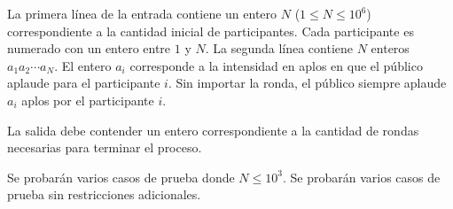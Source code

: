 \documentclass{oci}
\begin{document}
\begin{inputDescription}
La primera línea de la entrada contiene un entero $N$
($1 \leq N \leq 10^6$) correspondiente a la cantidad
inicial de participantes.
%
Cada participante es numerado con un entero entre $1$ y $N$.
%
La segunda línea contiene $N$ enteros $a_1 a_2 \cdots a_N$.
%
El entero $a_i$ corresponde a la intensidad en aplos en que el público
aplaude para el participante $i$.
%
Sin importar la ronda, el público siempre aplaude $a_i$ aplos por el participante
$i$.
\end{inputDescription}

\begin{outputDescription}
La salida debe contender un entero correspondiente a la cantidad de rondas
necesarias para terminar el proceso.
\end{outputDescription}

\begin{scoreDescription}
   Se probarán varios casos de prueba donde $N \leq 10^3$.
   Se probarán varios casos de prueba sin restricciones adicionales.
\end{scoreDescription}
\end{document}
